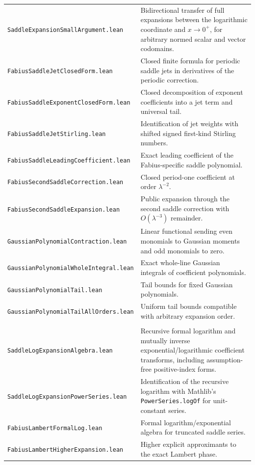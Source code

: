 \documentclass[11pt,oneside]{article}
\theoremstyle{definition}
\theoremstyle{remark}
\begin{document}
\begin{longtable}{>{\raggedright\arraybackslash}p{} >{\raggedright\arraybackslash}p{}}
\nolinkurl{SaddleExpansionSmallArgument.lean} & Bidirectional transfer of full expansions between the logarithmic coordinate and \(x\to0^+\), for arbitrary normed scalar and vector codomains. \\
\nolinkurl{FabiusSaddleJetClosedForm.lean} & Closed finite formula for periodic saddle jets in derivatives of the periodic correction. \\
\nolinkurl{FabiusSaddleExponentClosedForm.lean} & Closed decomposition of exponent coefficients into a jet term and universal tail. \\
\nolinkurl{FabiusSaddleJetStirling.lean} & Identification of jet weights with shifted signed first-kind Stirling numbers. \\
\nolinkurl{FabiusSaddleLeadingCoefficient.lean} & Exact leading coefficient of the Fabius-specific saddle polynomial. \\
\nolinkurl{FabiusSecondSaddleCorrection.lean} & Closed period-one coefficient at order \(\lambda^{-2}\). \\
\nolinkurl{FabiusSecondSaddleExpansion.lean} & Public expansion through the second saddle correction with \(O(\lambda^{-3})\) remainder. \\
\nolinkurl{GaussianPolynomialContraction.lean} & Linear functional sending even monomials to Gaussian moments and odd monomials to zero. \\
\nolinkurl{GaussianPolynomialWholeIntegral.lean} & Exact whole-line Gaussian integrals of coefficient polynomials. \\
\nolinkurl{GaussianPolynomialTail.lean} & Tail bounds for fixed Gaussian polynomials. \\
\nolinkurl{GaussianPolynomialTailAllOrders.lean} & Uniform tail bounds compatible with arbitrary expansion order. \\
\addlinespace[0.45em]
\multicolumn{2}{l}{\textbf{Lambert formal algebra and final expansion}}\\[0.25em]
\nolinkurl{SaddleLogExpansionAlgebra.lean} & Recursive formal logarithm and mutually inverse exponential/logarithmic coefficient transforms, including assumption-free positive-index forms. \\
\nolinkurl{SaddleLogExpansionPowerSeries.lean} & Identification of the recursive logarithm with Mathlib's \nolinkurl{PowerSeries.logOf} for unit-constant series. \\
\nolinkurl{FabiusLambertFormalLog.lean} & Formal logarithm/exponential algebra for truncated saddle series. \\
\nolinkurl{FabiusLambertHigherExpansion.lean} & Higher explicit approximants to the exact Lambert phase. \\

\end{longtable}
\end{document}

